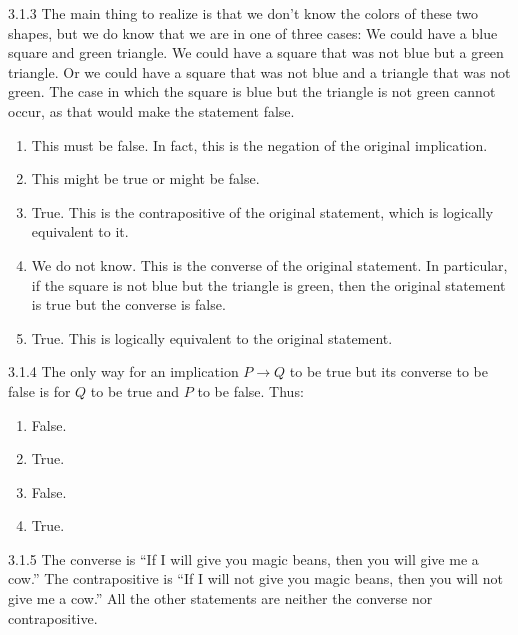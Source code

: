 \documentclass[11pt,]{book}
\theoremstyle{ptxplainnotitle}
\theoremstyle{ptxplaintitle}
\theoremstyle{ptxdefinitionnotitle}
\theoremstyle{ptxdefinitiontitle}
\theoremstyle{ptxdefinitionnotitle}
\theoremstyle{ptxdefinitiontitle}
\theoremstyle{ptxdefinitionnotitle}
\theoremstyle{ptxdefinitiontitle}
\theoremstyle{ptxdefinitiontitlenonumber}
\theoremstyle{ptxdefinitiontitlenonumber}
\numberwithin{equation}{chapter}
\newcommand{\imp}{\rightarrow}
\begin{document}
\begin{divisionexercise}{3.1.3}
\textbf{}\hypertarget{p-1947}{}%
The main thing to realize is that we don't know the colors of these two shapes, but we do know that we are in one of three cases: We could have a blue square and green triangle.  We could have a square that was not blue but a green triangle.  Or we could have a square that was not blue and a triangle that was not green.  The case in which the square is blue but the triangle is not green cannot occur, as that would make the statement false. \leavevmode%
\begin{enumerate}[label=(\alph*)]
\item\hypertarget{li-892}{}\hypertarget{p-1948}{}%
This must be false.  In fact, this is the negation of the original implication.%
\item\hypertarget{li-893}{}\hypertarget{p-1949}{}%
This might be true or might be false.%
\item\hypertarget{li-894}{}\hypertarget{p-1950}{}%
True.  This is the contrapositive of the original statement, which is logically equivalent to it.%
\item\hypertarget{li-895}{}\hypertarget{p-1951}{}%
We do not know.  This is the converse of the original statement.  In particular, if the square is not blue but the triangle is green, then the original statement is true but the converse is false.%
\item\hypertarget{li-896}{}\hypertarget{p-1952}{}%
True.  This is logically equivalent to the original statement.%
\end{enumerate}
%
\end{divisionexercise}%
\begin{divisionexercise}{3.1.4}
\textbf{}\hypertarget{p-1984}{}%
The only way for an implication \(P\imp Q\) to be true but its converse to be false is for \(Q\) to be true and \(P\) to be false.  Thus: \leavevmode%
\begin{enumerate}[label=(\alph*)]
\item\hypertarget{li-925}{}\hypertarget{p-1985}{}%
False.%
\item\hypertarget{li-926}{}\hypertarget{p-1986}{}%
True.%
\item\hypertarget{li-927}{}\hypertarget{p-1987}{}%
False.%
\item\hypertarget{li-928}{}\hypertarget{p-1988}{}%
True.%
\end{enumerate}
%
\end{divisionexercise}%
\begin{divisionexercise}{3.1.5}
\textbf{}\hypertarget{p-2028}{}%
The converse is ``If I will give you magic beans, then you will give me a cow.''  The contrapositive is ``If I will not give you magic beans, then you will not give me a cow.''  All the other statements are neither the converse nor contrapositive.%
\end{divisionexercise}%
\end{document}
